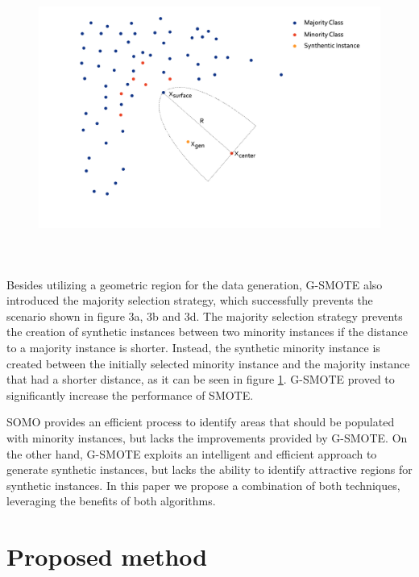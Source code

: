 \documentclass[parskip=full]{scrartcl}
\begin{document}
\begin{figure}[H]
	\centering
	\includegraphics[width=12cm, height=9.5cm, keepaspectratio]{./resources/fig4.png}
	\label{fig:GSMOTE}
\end{figure}

Besides utilizing a geometric region for the data generation, G-SMOTE also
introduced the majority selection strategy, which successfully prevents the
scenario shown in figure 3a, 3b and 3d. The majority selection strategy prevents
the creation of synthetic instances between two minority instances if the
distance to a majority instance is shorter. Instead, the synthetic minority
instance is created between the initially selected minority instance and the
majority instance that had a shorter distance, as it can be seen in figure \ref{fig:GSMOTE}.
G-SMOTE proved to significantly increase the performance of SMOTE. 

SOMO provides an efficient process to identify areas that should be populated
with minority instances, but lacks the improvements provided by G-SMOTE. On the
other hand, G-SMOTE exploits an intelligent and efficient approach to generate
synthetic instances, but lacks the ability to identify attractive regions for
synthetic instances. In this paper we propose a combination of both techniques,
leveraging the benefits of both algorithms. 

\section{Proposed method}
\end{document}
